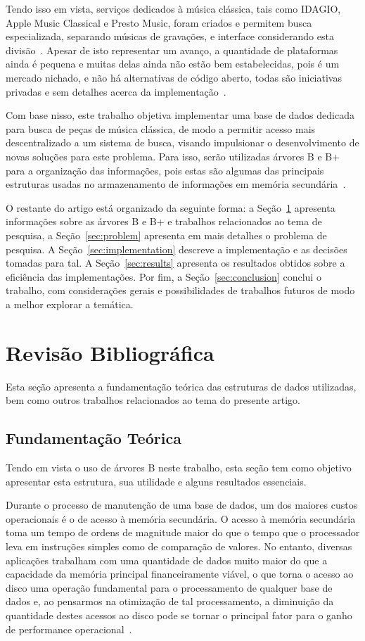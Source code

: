 \documentclass[12pt]{article}
\begin{document}
Tendo isso em vista, serviços dedicados à música clássica, tais como
IDAGIO, Apple Music Classical e Presto Music, foram criados e permitem busca
especializada, separando músicas de gravações, e interface considerando esta
divisão~\cite{Bl:25}.
Apesar de isto representar um avanço, a quantidade de plataformas ainda é pequena
e muitas delas ainda não estão bem estabelecidas, pois é um mercado nichado, e 
não há alternativas de código aberto, todas são iniciativas privadas e sem
detalhes acerca da implementação~\cite{Bl:25}.

Com base nisso, este trabalho objetiva implementar uma base de dados dedicada
para busca de peças de música clássica, de modo a permitir acesso mais
descentralizado a um sistema de busca, visando impulsionar o desenvolvimento de
novas soluções para este problema.
Para isso, serão utilizadas árvores B e B+ para a organização das informações,
pois estas são algumas das principais estruturas usadas no armazenamento de
informações em memória secundária~\cite{Co:79}.

O restante do artigo está organizado da seguinte forma:
a Seção~\ref{sec:revisao} apresenta informações sobre as árvores B e B+ e
trabalhos relacionados ao tema de pesquisa, a Seção~\ref{sec:problem} apresenta
em mais detalhes o problema de pesquisa. A Seção~\ref{sec:implementation}
descreve a implementação e as decisões tomadas para tal. A Seção~\ref{sec:results}
apresenta os resultados obtidos sobre a eficiência das implementações.
Por fim, a Seção~\ref{sec:conclusion} conclui o trabalho, com considerações
gerais e possibilidades de trabalhos futuros de modo a melhor explorar a temática.



\section{Revisão Bibliográfica} \label{sec:revisao}
Esta seção apresenta a fundamentação teórica das estruturas de dados utilizadas,
bem como outros trabalhos relacionados ao tema do presente artigo.

\subsection{Fundamentação Teórica}
Tendo em vista o uso de árvores B neste trabalho, esta seção tem como objetivo 
apresentar esta estrutura, sua utilidade e alguns resultados essenciais.

Durante o processo de manutenção de uma base de dados, um dos maiores custos
operacionais é o de acesso à memória secundária.
O acesso à memória secundária toma um tempo de ordens de magnitude maior do que
o tempo que o processador leva em instruções simples como de comparação de valores.
No entanto, diversas aplicações trabalham com uma quantidade de dados muito maior
do que a capacidade da memória principal financeiramente viável, o que torna o
acesso ao disco uma operação fundamental para o processamento de qualquer base
de dados e, ao pensarmos na otimização de tal processamento, a diminuição da
quantidade destes acessos ao disco pode se tornar o principal fator para o ganho
de performance operacional~\cite{clrs:22}.
\end{document}

